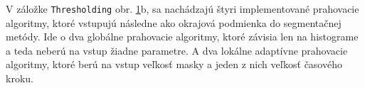 \documentclass[a4paper,11pt,oneside]{article}%
\begin{document}
V záložke \texttt{Thresholding} obr. \ref{fig:uidata}b, sa nachádzajú štyri implementované prahovacie algoritmy, ktoré vstupujú  následne ako okrajová podmienka do segmentačnej metódy. Ide o dva globálne prahovacie algoritmy, ktoré závisia len na histograme a teda neberú na vstup žiadne parametre. A dva lokálne adaptívne prahovacie algoritmy, ktoré berú na vstup veľkosť masky a jeden z nich veľkosť časového kroku.


\begin{figure}[H]%
    \begin{center} 
    \qquad
    \caption{}%
    \label{fig:uidata}%
     \end{center} 
\end{figure}
\end{document}

